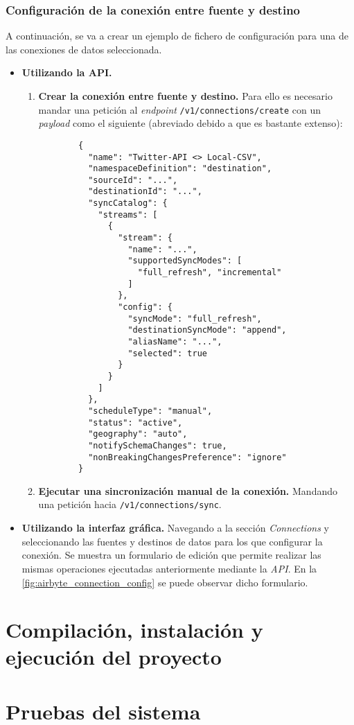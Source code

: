 \subsubsection{Configuración de la conexión entre fuente y destino}

A continuación, se va a crear un ejemplo de fichero de configuración para una de las conexiones de datos seleccionada.

\begin{itemize}
    
    \item \textbf{Utilizando la API.}
    
    \begin{enumerate}
        
        \item \textbf{Crear la conexión entre fuente y destino.} Para ello es necesario mandar una petición al \textit{endpoint} \verb|/v1/connections/create| con un \textit{payload} como el siguiente (abreviado debido a que es bastante extenso):

        \begin{verbatim}
        {
          "name": "Twitter-API <> Local-CSV",
          "namespaceDefinition": "destination",
          "sourceId": "...",
          "destinationId": "...",
          "syncCatalog": {
            "streams": [
              {
                "stream": {
                  "name": "...",
                  "supportedSyncModes": [
                    "full_refresh", "incremental"
                  ]
                },
                "config": {
                  "syncMode": "full_refresh",
                  "destinationSyncMode": "append",
                  "aliasName": "...",
                  "selected": true
                }
              }
            ]
          },
          "scheduleType": "manual",
          "status": "active",
          "geography": "auto",
          "notifySchemaChanges": true,
          "nonBreakingChangesPreference": "ignore"
        }
        \end{verbatim}
        
        \item \textbf{Ejecutar una sincronización manual de la conexión.} Mandando una petición hacia \verb|/v1/connections/sync|.
    
    \end{enumerate}
    
    \item \textbf{Utilizando la interfaz gráfica.} Navegando a la sección \textit{Connections} y seleccionando las fuentes y destinos de datos para los que configurar la conexión. Se muestra un formulario de edición que permite realizar las mismas operaciones ejecutadas anteriormente mediante la \textit{API}. En la \autoref{fig:airbyte_connection_config} se puede observar dicho formulario.

    
\end{itemize}

\section{Compilación, instalación y ejecución del proyecto}

\section{Pruebas del sistema}
